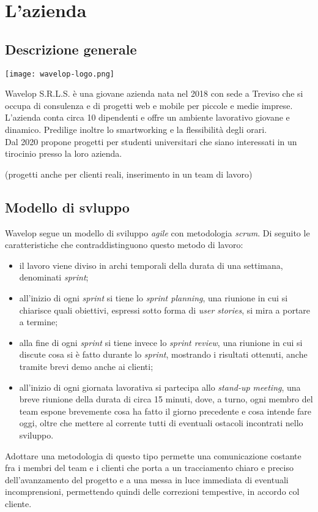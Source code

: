 \chapter{L'azienda}
\label{cap:azienda}

\section{Descrizione generale}

\begin{center}
	\texttt{[image: wavelop-logo.png]}
\end{center}

\noindent Wavelop S.R.L.S. è una giovane azienda nata nel 2018 con sede a Treviso che si occupa di consulenza e di progetti web e mobile per piccole e medie imprese.\\
L'azienda conta circa 10 dipendenti e offre un ambiente lavorativo giovane e dinamico. Predilige inoltre lo smartworking e la flessibilità degli orari.\\
Dal 2020 propone progetti per studenti universitari che siano interessati in un tirocinio presso la loro azienda. 

(progetti anche per clienti reali, inserimento in un team di lavoro)

\section{Modello di svluppo}

Wavelop segue un modello di sviluppo \textit{agile} con metodologia \textit{scrum}. Di seguito le caratteristiche che contraddistinguono questo metodo di lavoro:

\begin{itemize}
  \item il lavoro viene diviso in archi temporali della durata di una settimana, denominati \textit{sprint};
  \item all'inizio di ogni \textit{sprint} si tiene lo \textit{sprint planning}, una riunione in cui si chiarisce quali obiettivi, espressi sotto forma di \textit{user stories}, si mira a portare a termine;
  \item alla fine di ogni \textit{sprint} si tiene invece lo \textit{sprint review}, una riunione in cui si discute cosa si è fatto durante lo \textit{sprint}, mostrando i risultati ottenuti, anche tramite brevi demo anche ai clienti;
  \item all'inizio di ogni giornata lavorativa si partecipa allo \textit{stand-up meeting}, una breve riunione della durata di circa 15 minuti, dove, a turno, ogni membro del team espone brevemente cosa ha fatto il giorno precedente e cosa intende fare oggi, oltre che mettere al corrente tutti di eventuali ostacoli incontrati nello sviluppo.
\end{itemize}

Adottare una metodologia di questo tipo permette una comunicazione costante fra i membri del team e i clienti che porta a un tracciamento chiaro e preciso dell'avanzamento del progetto e a una messa in luce immediata di eventuali incomprensioni, permettendo quindi delle correzioni tempestive, in accordo col cliente.